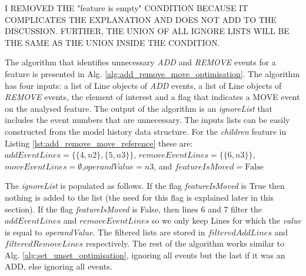 \documentclass{llncs}
\begin{document}
I REMOVED THE "feature is empty" CONDITION BECAUSE IT COMPLICATES THE EXPLANATION AND DOES NOT ADD TO THE DISCUSSION. FURTHER, THE UNION OF ALL IGNORE LISTS WILL BE THE SAME AS THE UNION INSIDE THE CONDITION. 

The algorithm that identifies unnecessary \emph{ADD} and \emph{REMOVE} events for a feature is presented in Alg. \ref{alg:add_remove_move_optimisation}.
The algorithm has four inputs: a list of Line objects of \emph{ADD} events, a list of Line objects of \emph{REMOVE} events, the element of interest and a flag that indicates a MOVE event on the analysed feature. 
The output of the algorithm is an \emph{ignoreList} that includes the event numbers that are unnecessary.
The inputs lists can be easily constructed from the model history data structure.
For the \emph{children} feature in Listing \ref{lst:add_remove_move_reference} these are: $addEventLines = \{  \{4, n2 \}, \{5, n3 \} \}$, $removeEventLines = \{\{6, n3 \}\}$, $moveEventLines = \emptyset$,\linebreak $operandValue = n3$, and $featureIsMoved = \mathrm{False}$

The \emph{ignoreList} is populated as follows.
If the flag \emph{featureIsMoved} is True then nothing is added to the list (the need for this flag is explained later in this section).
If the flag \emph{featureIsMoved} is False, then lines 6 and 7 filter the $addEventLines$ and $removeEventLines$ so we only keep Lines for which the \emph{value} is equal to \emph{operandValue}.
The filtered lists are stored in $filteredAddLines$ and $filteredRemoveLines$ respectively.
The rest of the algorithm works similar to Alg. \ref{alg:set_unset_optimisation}, ignoring all events but the last if it was an ADD, else ignoring all events. 

\end{document}
